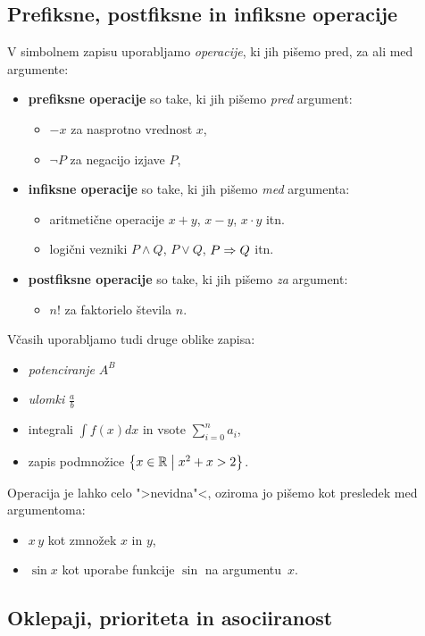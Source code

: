 \subsection{Prefiksne, postfiksne in infiksne operacije}

V simbolnem zapisu uporabljamo \emph{operacije}, ki jih pišemo pred, za ali med argumente:
%
\begin{itemize}
\item \textbf{prefiksne operacije} so take, ki jih pišemo \emph{pred} argument:
  \begin{itemize}
  \item  $-x$ za nasprotno vrednost $x$,
  \item  $\neg P$ za negacijo izjave $P$,
  \end{itemize}
\item \textbf{infiksne operacije} so take, ki jih pišemo \emph{med} argumenta:
  \begin{itemize}
  \item aritmetične operacije $x + y$, $x - y$, $x \cdot y$ itn.
  \item logični vezniki $P \land Q$, $P \lor Q$, $P \Rightarrow Q$ itn.
  \end{itemize}
\item \textbf{postfiksne operacije} so take, ki jih pišemo \emph{za} argument:
  \begin{itemize}
  \item $n!$ za faktorielo števila $n$.
  \end{itemize}
\end{itemize}
%
Včasih uporabljamo tudi druge oblike zapisa:
%
\begin{itemize}
\item \emph{potenciranje} $A^B$
\item \emph{ulomki} $\frac{a}{b}$
\item integrali $\int f(x) dx$ in vsote $\sum_{i = 0}^n a_i$,
\item zapis podmnožice $\left\{x \in \mathbb{R} \; \middle| \; x^2 + x > 2\right\}$.
\end{itemize}
%
Operacija je lahko celo ">nevidna"<, oziroma jo pišemo kot presledek med argumentoma:
%
\begin{itemize}
\item $x \, y$ kot zmnožek $x$ in $y$,
\item $\sin x$ kot uporabe funkcije $\sin$ na argumentu~$x$.
\end{itemize}


\subsection{Oklepaji, prioriteta in asociiranost}

